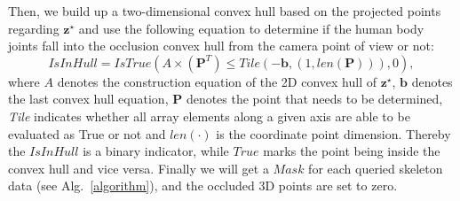 \documentclass[lettersize,journal]{IEEEtran}
\begin{document}
Then, we build up a two-dimensional convex hull based on the projected points regarding $\textbf{z}^{\star}$ and use the following equation to determine if the human body joints fall into the occlusion convex hull from the camera point of view or not:
\begin{equation}
    IsInHull = IsTrue(A\times(\mathbf{P}^T)\leq Tile(-\mathbf{b}, (1,len(\mathbf{P}))),0), 
\end{equation}
where $A$ denotes the construction equation of the 2D convex hull of $\textbf{z}^{\star}$, $\mathbf{b}$ denotes the last convex hull equation, $\mathbf{P}$ denotes the point that needs to be determined, \textit{Tile} indicates whether all array elements along a given axis are able to be evaluated as True or not and $len(\cdot)$ is the coordinate point dimension.
Thereby the $IsInHull$ is a binary indicator, while $True$ marks the point being inside the convex hull and vice versa. Finally we will get a $Mask$ for each queried skeleton data (see Alg.~\ref{algorithm}), and the occluded 3D points are set to zero.
\end{document}
